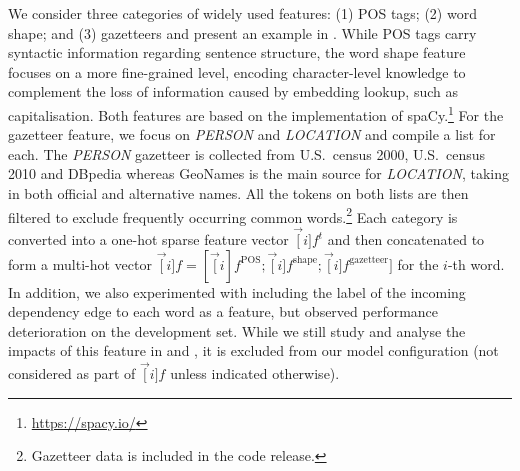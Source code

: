 We consider three categories of widely used features: (1) POS tags; (2) word shape; and (3) gazetteers and present an example in .
While POS tags carry syntactic information regarding sentence structure, the word shape feature focuses on a more fine-grained level, encoding character-level knowledge to complement the loss of information caused by embedding lookup, such as capitalisation. 
Both features are based on the implementation of spaCy.\footnote{\url{https://spacy.io/}}
For the gazetteer feature, we focus on \textit{PERSON} and \textit{LOCATION} and compile a list for each. 
The \textit{PERSON} gazetteer is collected from U.S.\ census 2000, U.S.\ census 2010 and DBpedia whereas GeoNames is the main source for \textit{LOCATION}, taking in both official and alternative names. 
All the tokens on both lists are then filtered to exclude frequently occurring common words.\footnote{Gazetteer data is included in the code release.}
Each category is converted into a one-hot sparse feature vector $\vec[i]{f}^{t}$ and then concatenated to form a multi-hot vector $\vec[i]{f} = [\vec[i]{f}^{\textrm{POS}};\vec[i]{f}^{\textrm{shape}};\vec[i]{f}^{\textrm{gazetteer}}]$ for the $i$-th word. 
In addition, we also experimented with including the label of the incoming dependency edge to each word as a feature, but observed performance deterioration on the development set.
While we still study and analyse the impacts of this feature in  and , it is excluded from our model configuration (not considered as part of $\vec[i]{f}$ unless indicated otherwise).
